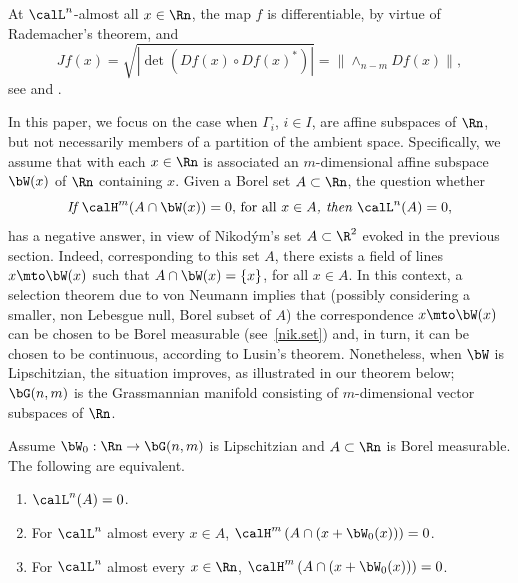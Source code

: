 At $\calL^n$-almost all $x \in \Rn$, the map $f$ is differentiable, by virtue of Rademacher's theorem, and
\begin{equation*}
Jf(x) = \sqrt{ \left| \det \left(Df(x) \circ Df(x)^*\right)\right|} =\| {\wedge}_{n-m} Df(x)\|,
\end{equation*}
see \cite[Chap.\,3, \S 4]{EVANS.GARIEPY} and \cite[3.2.1 \& 3.2.11]{GMT}.
\par
In this paper, we focus on the case when $\Gamma_i$, $i \in I$, are affine subspaces of $\Rn$, but not necessarily members of a partition of the ambient space.
Specifically, we assume that with each $x \in \Rn$ is associated an $m$-dimensional affine subspace $\bW(x)$ of $\Rn$ containing $x$.
Given a Borel set $A \subset \Rn$, the question whether
\begin{equation}
\label{eq.1}
\textit{If } \calH^m(A \cap \bW(x))=0 \text{, for all } x \in A \textit{, then } \calL^n(A)=0,
\end{equation}
has a negative answer, in view of Nikod\'ym's set $A \subset \R^2$ evoked in the previous section.
Indeed, corresponding to this set $A$, there exists a field of lines $x \mto \bW(x)$ such that $A \cap \bW(x) = \{x\}$, for all $x \in A$.
In this context, a selection theorem due to von Neumann implies that (possibly considering a smaller, non Lebesgue null, Borel subset of $A$) the correspondence $x \mto \bW(x)$ can be chosen to be Borel measurable (see~\ref{nik.set}) and, in turn, it can be chosen to be continuous, according to Lusin's theorem.
Nonetheless, when $\bW$ is Lipschitzian, the situation improves, as illustrated in our theorem below; $\bG(n,m)$ is the Grassmannian manifold consisting of $m$-dimensional vector subspaces of $\Rn$.

\begin{Theorem*}
Assume $\bW_0: \Rn \to \bG(n,m)$ is Lipschitzian and $A \subset \Rn$ is Borel measurable. The following are equivalent.
\begin{enumerate}\renewcommand{\theenumi}{\Alph{enumi}}
\item\label{enum:thA} $\calL^n(A)=0$.
\item\label{enum:thB} For $\calL^n$ almost every $x \in A$, $\calH^m\left(A \cap (x+\bW_0(x))\right)=0$.
\item\label{enum:thC} For $\calL^n$ almost every $x \in \Rn$, $\calH^m\left(A \cap (x+\bW_0(x))\right)=0$.
\end{enumerate}
\end{Theorem*}

